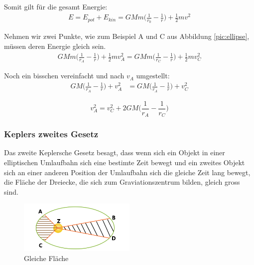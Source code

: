 \begin{refsection}
\noindent{}Somit gilt für die gesamt Energie:
\begin{align*}
E = E_{pot} + E_{kin} = GMm \biggr( \frac{1}{r_0} - \frac{1}{r}\biggr) + \frac{1}{2}mv^2
\end{align*}

\noindent{}Nehmen wir zwei Punkte, wie zum Beispiel A und C aus Abbildung \ref{pic:ellipse}, müssen deren Energie gleich sein.
\begin{align*}
GMm \biggr( \frac{1}{r_A} - \frac{1}{r}\biggr) + \frac{1}{2}mv_A^2 = GMm \biggr( \frac{1}{r_C} - \frac{1}{r}\biggr) + \frac{1}{2}mv_C^2
\end{align*}

\noindent{}Noch ein bisschen vereinfacht und nach $v_A$ umgestellt:
\begin{align*}
GM \biggr( \frac{1}{r_A} - \frac{1}{r}\biggr) + v_A^2 &=  GM \biggr( \frac{1}{r_A} - \frac{1}{r}\biggr) + v_C^2
\end{align*}

\begin{equation}
v_A^2 = v_C^2 + 2GM \biggr( \frac{1}{r_A} - \frac{1}{r_C}\biggr)
\label{eq:keplerenergie}
\end{equation}

\subsubsection{Keplers zweites Gesetz}
Das zweite Keplersche Gesetz besagt, dass wenn sich ein
 Objekt in einer elliptischen Umlaufbahn sich eine bestimte Zeit bewegt und ein zweites Objekt sich an einer anderen Position der Umlaufbahn sich die gleiche Zeit lang bewegt, die Fläche der Dreiecke, die sich zum Graviationszentrum bilden, gleich gross sind.
\begin{figure}[h]
    \centering
    \includegraphics[width=0.5\textwidth]{gps/pictures/keplersec.png}
    \caption{Gleiche Fläche}
\end{figure}


\end{refsection}
